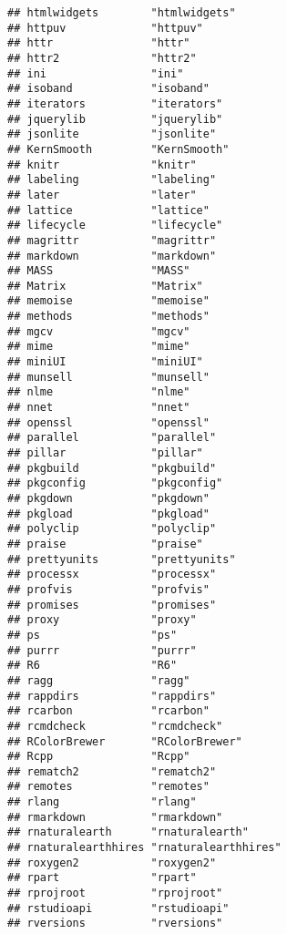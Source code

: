 \documentclass[
]{article}
\begin{document}
\begin{verbatim}
## htmlwidgets        "htmlwidgets"       
## httpuv             "httpuv"            
## httr               "httr"              
## httr2              "httr2"             
## ini                "ini"               
## isoband            "isoband"           
## iterators          "iterators"         
## jquerylib          "jquerylib"         
## jsonlite           "jsonlite"          
## KernSmooth         "KernSmooth"        
## knitr              "knitr"             
## labeling           "labeling"          
## later              "later"             
## lattice            "lattice"           
## lifecycle          "lifecycle"         
## magrittr           "magrittr"          
## markdown           "markdown"          
## MASS               "MASS"              
## Matrix             "Matrix"            
## memoise            "memoise"           
## methods            "methods"           
## mgcv               "mgcv"              
## mime               "mime"              
## miniUI             "miniUI"            
## munsell            "munsell"           
## nlme               "nlme"              
## nnet               "nnet"              
## openssl            "openssl"           
## parallel           "parallel"          
## pillar             "pillar"            
## pkgbuild           "pkgbuild"          
## pkgconfig          "pkgconfig"         
## pkgdown            "pkgdown"           
## pkgload            "pkgload"           
## polyclip           "polyclip"          
## praise             "praise"            
## prettyunits        "prettyunits"       
## processx           "processx"          
## profvis            "profvis"           
## promises           "promises"          
## proxy              "proxy"             
## ps                 "ps"                
## purrr              "purrr"             
## R6                 "R6"                
## ragg               "ragg"              
## rappdirs           "rappdirs"          
## rcarbon            "rcarbon"           
## rcmdcheck          "rcmdcheck"         
## RColorBrewer       "RColorBrewer"      
## Rcpp               "Rcpp"              
## rematch2           "rematch2"          
## remotes            "remotes"           
## rlang              "rlang"             
## rmarkdown          "rmarkdown"         
## rnaturalearth      "rnaturalearth"     
## rnaturalearthhires "rnaturalearthhires"
## roxygen2           "roxygen2"          
## rpart              "rpart"             
## rprojroot          "rprojroot"         
## rstudioapi         "rstudioapi"        
## rversions          "rversions"         

\end{verbatim}
\end{document}
